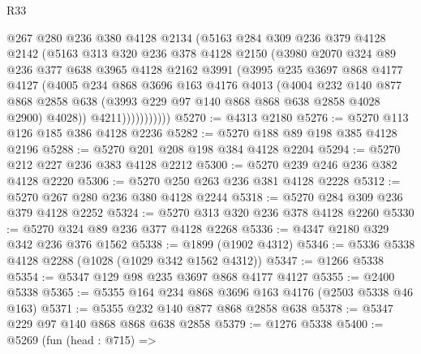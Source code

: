 \begin{lexlean}{R33}
\begin{coremodule}
                  @267
                  @280
                  @236
                  @380
                  @4128
                  @2134
                  (@5163
                    @284
                    @309
                    @236
                    @379
                    @4128
                    @2142
                    (@5163
                      @313
                      @320
                      @236
                      @378
                      @4128
                      @2150
                      (@3980
                        @2070
                        @324
                        @89
                        @236
                        @377
                        @638
                        @3965
                        @4128
                        @2162
                        @3991
                        (@3995
                          @235
                          @3697
                          @868
                          @4177
                          @4127
                          (@4005
                            @234
                            @868
                            @3696
                            @163
                            @4176
                            @4013
                            (@4004
                              @232
                              @140
                              @877
                              @868
                              @2858
                              @638
                              (@3993 @229 @97 @140 @868 @868 @638 @2858 @4028 @2900)
                              @4028))
                          @4211)))))))))))
@5270 := @4313 @2180
@5276 := @5270 @113 @126 @185 @386 @4128 @2236
@5282 := @5270 @188 @89 @198 @385 @4128 @2196
@5288 := @5270 @201 @208 @198 @384 @4128 @2204
@5294 := @5270 @212 @227 @236 @383 @4128 @2212
@5300 := @5270 @239 @246 @236 @382 @4128 @2220
@5306 := @5270 @250 @263 @236 @381 @4128 @2228
@5312 := @5270 @267 @280 @236 @380 @4128 @2244
@5318 := @5270 @284 @309 @236 @379 @4128 @2252
@5324 := @5270 @313 @320 @236 @378 @4128 @2260
@5330 := @5270 @324 @89 @236 @377 @4128 @2268
@5336 := @4347 @2180 @329 @342 @236 @376 @1562
@5338 := @1899 (@1902 @4312)
@5346 := @5336 @5338 @4128 @2288 (@1028 (@1029 @342 @1562 @4312))
@5347 := @1266 @5338
@5354 := @5347 @129 @98 @235 @3697 @868 @4177 @4127
@5355 := @2400 @5338
@5365 := @5355 @164 @234 @868 @3696 @163 @4176 (@2503 @5338 @46 @163)
@5371 := @5355 @232 @140 @877 @868 @2858 @638
@5378 := @5347 @229 @97 @140 @868 @868 @638 @2858
@5379 := @1276 @5338
@5400 := @5269
    (fun (head : @715) =>

\end{coremodule}
\end{lexlean}

